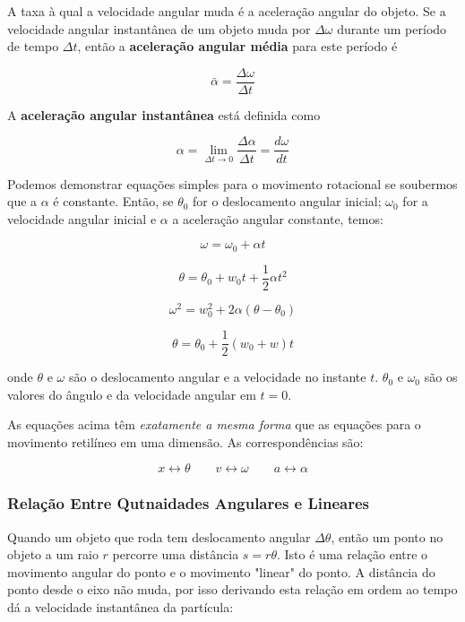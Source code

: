 A taxa à qual a velocidade angular muda é a aceleração angular do objeto. Se a velocidade angular instantânea de um objeto muda por $\Delta \omega$ durante um período de tempo $\Delta t$, então a \textbf{aceleração angular média} para este período é

\begin{equation}
    \bar{\alpha}=\frac{\Delta \omega}{\Delta t}
\end{equation}

A \textbf{aceleração angular instantânea} está definida como

\begin{equation}
    \alpha = \lim_{\Delta t \to 0}\frac{\Delta \alpha}{\Delta t}=\frac{d\omega}{dt}
\end{equation}

Podemos demonstrar equações simples para o movimento rotacional se soubermos que a $\alpha$ é constante. Então, se $\theta_0$ for o deslocamento angular inicial; $\omega_0$ for a velocidade angular inicial e $\alpha$ a aceleração angular constante, temos:

\begin{equation}
    \omega = \omega_0+\alpha t
\end{equation}

\begin{equation}
    \theta = \theta_0+w_0t+\frac{1}{2}\alpha t^2
\end{equation}

\begin{equation}
    \omega^2=w_0^2+2\alpha(\theta - \theta_0)
\end{equation}

\begin{equation}
    \theta = \theta_0 + \frac{1}{2}(w_0+w)t
\end{equation}

onde $\theta$ e $\omega$ são o deslocamento angular e a velocidade no instante $t$. $\theta_0$ e $\omega_0$ são os valores do ângulo e da velocidade angular em $t=0$.

As equações acima têm \emph{exatamente a mesma forma} que as equações para o movimento retilíneo em uma dimensão. As correspondências são:

$$
x \leftrightarrow \theta \qquad v \leftrightarrow \omega \qquad a \leftrightarrow \alpha
$$

\subsubsection{Relação Entre Qutnaidades Angulares e Lineares}
Quando um objeto que roda tem deslocamento angular $\Delta \theta$, então um ponto no objeto a um raio $r$ percorre uma distância $s=r\theta$. Isto é uma relação entre o movimento angular do ponto e o movimento "linear" do ponto. A distância do ponto desde o eixo não muda, por isso derivando esta relação em ordem ao tempo dá a velocidade instantânea da partícula:

